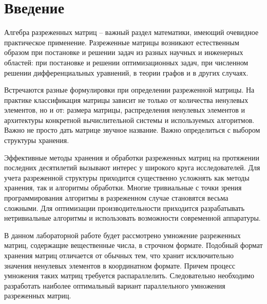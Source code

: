 \documentclass{report}
\begin{document}
\setcounter{page}{2}

\tableofcontents
\newpage

\section*{Введение}
Алгебра разреженных матриц – важный раздел математики, имеющий очевидное практическое применение. Разреженные матрицы возникают естественным образом при постановке и решении задач из разных научных и инженерных областей: при постановке и решении оптимизационных задач, при численном решении дифференциальных уравнений, в теории графов и в других случаях.

\par Встречаются разные формулировки при определении разреженной матрицы. На практике классификация матрицы зависит не только от количества ненулевых элементов, но и от: размера матрицы, распределения ненулевых элементов и архитектуры конкретной вычислительной системы и используемых алгоритмов. Важно не просто дать матрице звучное название. Важно определиться с выбором структуры хранения.

\par Эффективные методы хранения и обработки разреженных матриц на протяжении последних десятилетий вызывают интерес у широкого круга исследователей. Для учета разреженной структуры приходится существенно усложнять как методы хранения, так и алгоритмы обработки. Многие тривиальные с точки зрения программирования алгоритмы в разреженном случае становятся весьма сложными. Для оптимизации производительности приходится разрабатывать нетривиальные алгоритмы и использовать возможности современной аппаратуры.

\par В данном лабораторной работе будет рассмотрено умножение разреженных матриц, содержащие вещественные числа, в строчном формате. Подобный формат хранения матриц отличается от обычных тем, что хранит исключительно значения ненулевых элементов в координатном формате. Причем процесс умножения таких матриц требуется распараллелить. Следовательно необходимо разработать наиболее оптимальный вариант параллельного умножения разреженных матриц.
\newpage

\end{document}
